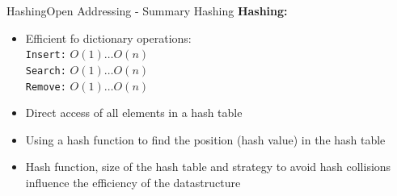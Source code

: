 
\begin{frame}{Hashing}{Open Addressing - Summary Hashing}
  \textbf{Hashing:}
  \begin{itemize}
    \item<2->
      Efficient fo dictionary operations:\\
      \hspace{1.5em}\texttt{Insert:} $O(1) \dots O(n)$\\
      \hspace{1.5em}\texttt{Search:} $O(1) \dots O(n)$\\
      \hspace{1.5em}\texttt{Remove:} $O(1) \dots O(n)$
    \item<3->
      Direct access of all elements in a hash table 
    \item<4->
      Using a hash function to find the position (hash value) in the hash table
    \item<5->
      Hash function, size of the hash table and strategy to
      avoid hash collisions influence the efficiency of the
      datastructure
  \end{itemize}
\end{frame}


